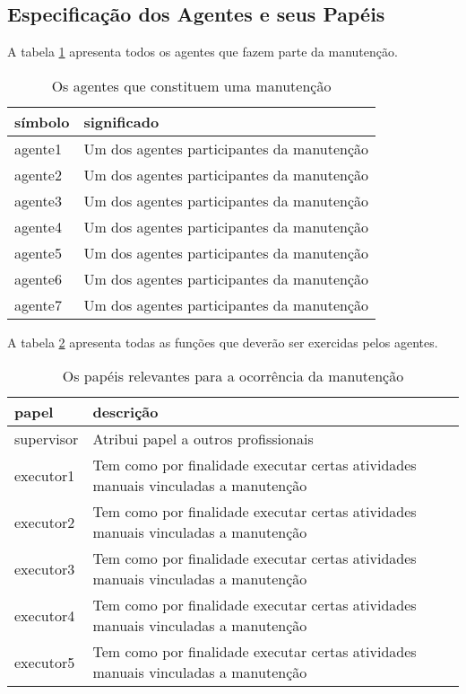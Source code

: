 \subsection{Especificação dos Agentes e seus Papéis}

A tabela \ref{agents} apresenta todos os agentes que fazem parte da manutenção. 
\begin{table}[H]
\centering
\begin{tabular}{|l|l|}
\hline
\textbf{símbolo} & \textbf{significado} \\ \hline
agente1 & Um dos agentes participantes da manutenção \\ \hline
agente2 & Um dos agentes participantes da manutenção \\ \hline
agente3 & Um dos agentes participantes da manutenção \\ \hline
agente4 & Um dos agentes participantes da manutenção \\ \hline
agente5 & Um dos agentes participantes da manutenção \\ \hline
agente6 & Um dos agentes participantes da manutenção \\ \hline
agente7 & Um dos agentes participantes da manutenção \\ \hline
\end{tabular}
\caption{Os agentes que constituem uma manutenção}
\label{agents}
\end{table}

 A tabela \ref{roles} apresenta todas as funções que deverão ser exercidas pelos agentes.

\begin{table}[H]
\centering
\begin{tabular}{|l|l|}
\hline
\textbf{papel} & \textbf{descrição} \\ \hline
supervisor & Atribui papel a outros profissionais \\ \hline
executor1 & Tem como por finalidade executar certas atividades manuais vinculadas a manutenção \\ \hline
executor2 & Tem como por finalidade executar certas atividades manuais vinculadas a manutenção \\ \hline
executor3 & Tem como por finalidade executar certas atividades manuais vinculadas a manutenção \\ \hline
executor4 & Tem como por finalidade executar certas atividades manuais vinculadas a manutenção \\ \hline
executor5 & Tem como por finalidade executar certas atividades manuais vinculadas a manutenção \\ \hline
\end{tabular}
\caption{Os papéis relevantes para a ocorrência da manutenção}
\label{roles}
\end{table}

